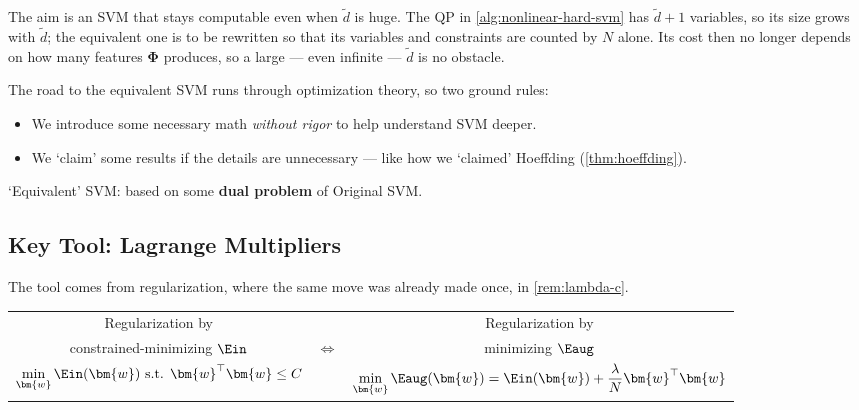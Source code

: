 \begin{note}
    The aim is an SVM that stays computable even when \(\tilde{d}\) is huge.
    The QP in \autoref{alg:nonlinear-hard-svm} has \(\tilde{d} + 1\)
    variables, so its size grows with \(\tilde{d}\); the equivalent one is to
    be rewritten so that its variables and constraints are counted by \(N\)
    alone. Its cost then no longer depends on how many features
    \(\bm{\Phi}\) produces, so a large --- even infinite --- \(\tilde{d}\) is
    no obstacle.
\end{note}

\begin{remark}
    The road to the equivalent SVM runs through optimization theory, so two
    ground rules:
    \begin{itemize}
        \item We introduce some necessary math \emph{without rigor} to help
            understand SVM deeper.
        \item We `claim' some results if the details are unnecessary --- like
            how we `claimed' Hoeffding (\autoref{thm:hoeffding}).
    \end{itemize}
\end{remark}

\begin{moral}
    `Equivalent' SVM: based on some \textbf{dual problem} of Original SVM.
\end{moral}

\subsection{Key Tool: Lagrange Multipliers}

The tool comes from regularization, where the same move was already made
once, in \autoref{rem:lambda-c}.

\begin{center}
    \begin{tabular}{@{}c@{\quad}c@{\quad}c@{}}
        Regularization by & & Regularization by\\
        constrained-minimizing \(\Ein\) & \(\iff\) & minimizing
            \(\Eaug\)\\[4pt]
        \(\displaystyle \min_{\bm{w}} \Ein(\bm{w}) \text{ s.t. }
            \bm{w}^\top \bm{w} \le C\)
        & &
        \(\displaystyle \min_{\bm{w}} \Eaug(\bm{w}) = \Ein(\bm{w}) +
            \frac{\lambda}{N} \bm{w}^\top \bm{w}\)
    \end{tabular}
\end{center}


